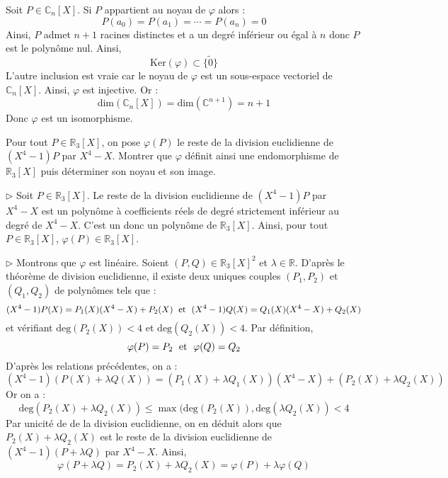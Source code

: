 \documentclass[a4paper,10pt]{report}
\begin{document}
\medskip

\noindent Soit $P \in \mathbb{C}_n[X]$. Si $P$ appartient au noyau de $\varphi$ alors :
$$ P(a_0) = P(a_1) = \cdots = P(a_n) = 0$$
Ainsi, $P$ admet $n+1$ racines distinctes et a un degré inférieur ou égal à $n$ donc $P$ est le polynôme nul. Ainsi,
$$ \textrm{Ker}(\varphi) \subset \lbrace \tilde{0} \rbrace$$
L'autre inclusion est vraie car le noyau de $\varphi$ est un sous-espace vectoriel de $\mathbb{C}_n[X]$. Ainsi, $\varphi$ est injective. Or :
$$ \textrm{dim}(\mathbb{C}_n[X]) = \textrm{dim}(\mathbb{C}^{n+1}) = n+1$$
Donc $\varphi$ est un isomorphisme.

\medskip

\begin{Exercice}{} Pour tout $P \in \mathbb{R}_3[X]$, on pose $\varphi(P)$ le reste de la division euclidienne de $(X^4-1)P$ par $X^4-X$. Montrer que $\varphi$ définit ainsi une endomorphisme de $\mathbb{R}_3[X]$ puis déterminer son noyau et son image.
\end{Exercice} 

\corr 

\medskip

\noindent $\rhd$ Soit $P\in \mathbb{R}_3[X]$. Le reste de la division euclidienne de $(X^4-1)P$ par $X^4-X$ est un polynôme à coefficients réels de degré strictement inférieur au degré de $X^4-X$. C'est un donc un polynôme de $\mathbb{R}_3[X]$. Ainsi, pour tout $P \in \mathbb{R}_3[X]$, $\varphi(P) \in \mathbb{R}_3[X]$.

\medskip

\noindent $\rhd$ Montrons que $\varphi$ est linéaire. Soient $(P,Q) \in \mathbb{R}_3[X]^2$ et $\lambda \in \mathbb{R}$. D'après le théorème de division euclidienne, il existe deux uniques couples $(P_1,P_2)$ et $(Q_1,Q_2)$ de polynômes tels que :
$$ (X^4-1)P(X) = P_1(X)(X^4-X)+ P_2(X) \; \hbox{ et } \; (X^4-1)Q(X) = Q_1(X)(X^4-X)+ Q_2(X)$$
et vérifiant $\textrm{deg}(P_2(X))<4$ et $\textrm{deg}(Q_2(X))<4$. Par définition,
$$ \varphi(P)= P_2 \; \hbox{ et } \; \varphi(Q) = Q_2$$
D'après les relations précédentes, on a :
$$ (X^4-1)(P(X) + \lambda Q(X))  = (P_1(X)+ \lambda Q_1(X))(X^4-X) + (P_2(X)+ \lambda Q_2(X))$$
Or on a :
$$ \textrm{deg}(P_2(X)+ \lambda Q_2(X)) \leq \max(\textrm{deg}(P_2(X)), \textrm{deg}(\lambda Q_2(X))<4$$
Par unicité de de la division euclidienne, on en déduit alors que $P_2(X)+ \lambda Q_2(X)$ est le reste de la division euclidienne de $(X^4-1)(P+ \lambda Q)$ par $X^4-X$. Ainsi,
 $$\varphi(P + \lambda Q) = P_2(X)+ \lambda Q_2(X) = \varphi(P) + \lambda \varphi(Q)$$
\end{document}
